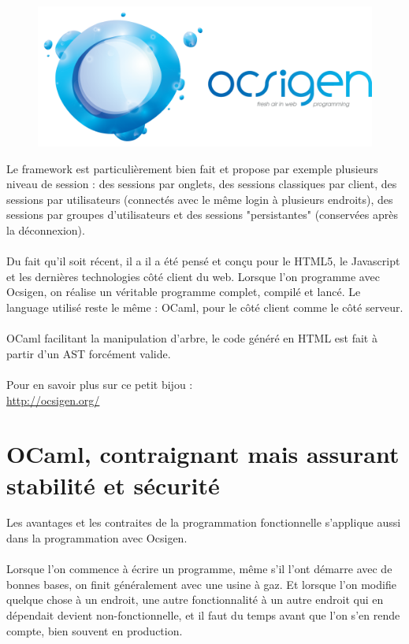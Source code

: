 \documentclass{life-fr}
\begin{document}
\begin{figure}[H]
  \begin{center}
    \includegraphics[width=13cm]{img/ocsigen.png}
  \end{center}
\end{figure}

Le framework est particulièrement bien fait et propose par exemple plusieurs niveau de session : des sessions par onglets, des sessions classiques par client, des sessions par utilisateurs (connectés avec le même login à plusieurs endroits), des sessions par groupes d'utilisateurs et des sessions "persistantes" (conservées après la déconnexion).\\
\\
Du fait qu'il soit récent, il a  il a été pensé et conçu pour le HTML5, le Javascript et les dernières technologies côté client du web. Lorsque l'on programme avec Ocsigen, on réalise un véritable programme complet, compilé et lancé. Le language utilisé reste le même : OCaml, pour le côté client comme le côté serveur.\\
\\
OCaml facilitant la manipulation d'arbre, le code généré en HTML est fait à partir d'un AST forcément valide.\\
\\
Pour en savoir plus sur ce petit bijou :\\
\url{http://ocsigen.org/}

\section{OCaml, contraignant mais assurant stabilité et sécurité}

Les avantages et les contraites de la programmation fonctionnelle s'applique aussi dans la programmation avec Ocsigen.\\
\\
Lorsque l'on commence à écrire un programme, même s'il l'ont démarre avec de bonnes bases, on finit généralement avec une usine à gaz. Et lorsque l'on modifie quelque chose à un endroit, une autre fonctionnalité à un autre endroit qui en dépendait devient non-fonctionnelle, et il faut du temps avant que l'on s'en rende compte, bien souvent en production.\\
\end{document}
